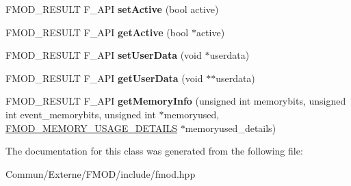 \begin{DoxyCompactItemize}
\item 
F\+M\+O\+D\+\_\+\+R\+E\+S\+U\+LT F\+\_\+\+A\+PI {\bfseries set\+Active} (bool active)\hypertarget{class_f_m_o_d_1_1_reverb_ace7f7f68d6f6298a356b9ee831f50aae}{}\label{class_f_m_o_d_1_1_reverb_ace7f7f68d6f6298a356b9ee831f50aae}

\item 
F\+M\+O\+D\+\_\+\+R\+E\+S\+U\+LT F\+\_\+\+A\+PI {\bfseries get\+Active} (bool $\ast$active)\hypertarget{class_f_m_o_d_1_1_reverb_a50f3bbcec09517e400fa606330738e2b}{}\label{class_f_m_o_d_1_1_reverb_a50f3bbcec09517e400fa606330738e2b}

\item 
F\+M\+O\+D\+\_\+\+R\+E\+S\+U\+LT F\+\_\+\+A\+PI {\bfseries set\+User\+Data} (void $\ast$userdata)\hypertarget{class_f_m_o_d_1_1_reverb_ad29004efcf52bf367bc13fde07527647}{}\label{class_f_m_o_d_1_1_reverb_ad29004efcf52bf367bc13fde07527647}

\item 
F\+M\+O\+D\+\_\+\+R\+E\+S\+U\+LT F\+\_\+\+A\+PI {\bfseries get\+User\+Data} (void $\ast$$\ast$userdata)\hypertarget{class_f_m_o_d_1_1_reverb_ac12115e79aebe3f8150c971b75de38c7}{}\label{class_f_m_o_d_1_1_reverb_ac12115e79aebe3f8150c971b75de38c7}

\item 
F\+M\+O\+D\+\_\+\+R\+E\+S\+U\+LT F\+\_\+\+A\+PI {\bfseries get\+Memory\+Info} (unsigned int memorybits, unsigned int event\+\_\+memorybits, unsigned int $\ast$memoryused, \hyperlink{struct_f_m_o_d___m_e_m_o_r_y___u_s_a_g_e___d_e_t_a_i_l_s}{F\+M\+O\+D\+\_\+\+M\+E\+M\+O\+R\+Y\+\_\+\+U\+S\+A\+G\+E\+\_\+\+D\+E\+T\+A\+I\+LS} $\ast$memoryused\+\_\+details)\hypertarget{class_f_m_o_d_1_1_reverb_a9be1262ba585537bdd32e569eb999d05}{}\label{class_f_m_o_d_1_1_reverb_a9be1262ba585537bdd32e569eb999d05}

\end{DoxyCompactItemize}


The documentation for this class was generated from the following file\+:\begin{DoxyCompactItemize}
\item 
Commun/\+Externe/\+F\+M\+O\+D/include/fmod.\+hpp\end{DoxyCompactItemize}
